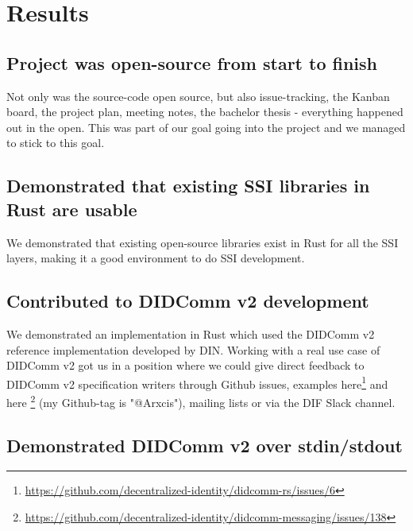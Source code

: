 \hypertarget{results}{%
\chapter{Results}\label{results}}


\section{Project was open-source from start to finish}

Not only was the source-code open source, but also issue-tracking, the Kanban board, the project plan, meeting notes, the bachelor thesis - everything happened out in the open. This was part of our goal going into the project and we managed to stick to this goal.


\section{Demonstrated that existing SSI libraries in Rust are usable}

We demonstrated that existing open-source libraries exist in Rust for all the SSI layers, making it a good environment to do SSI development.


\section{Contributed to DIDComm v2 development}

We demonstrated an implementation in Rust which used the DIDComm v2 reference implementation developed by DIN. Working with a real use case of DIDComm v2 got us in a position where we could give direct feedback to DIDComm v2 specification writers through Github issues, examples here\footnote{\url{https://github.com/decentralized-identity/didcomm-rs/issues/6}} and here \footnote{\url{https://github.com/decentralized-identity/didcomm-messaging/issues/138}} (my Github-tag is "@Arxcis"), mailing lists or via the DIF Slack channel.




\pagebreak




\section{Demonstrated DIDComm v2 over stdin/stdout}


